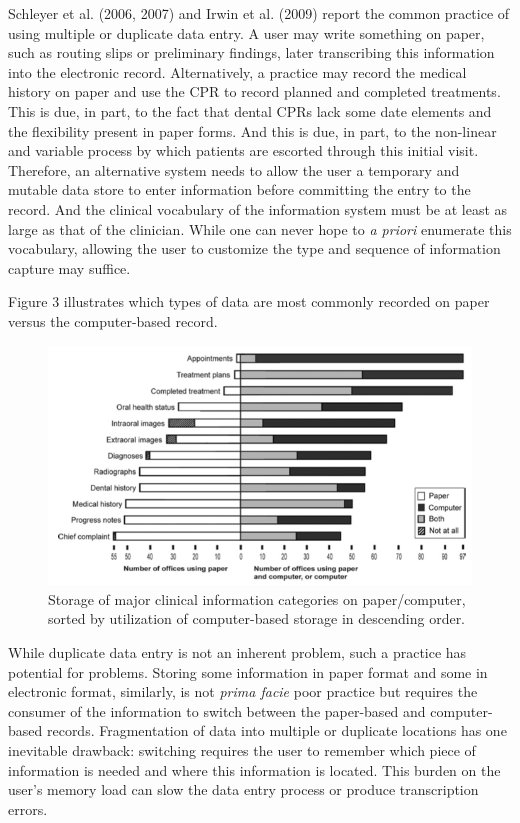 \documentclass[11pt]{article}
\begin{document}
Schleyer et al. (2006, 2007) and Irwin et al. (2009) report the common practice of using multiple or duplicate data entry. A user may write something on paper, such as routing slips or preliminary findings, later transcribing this information into the electronic record. Alternatively, a practice may record the medical history on paper and use the CPR to record planned and completed treatments. This is due, in part, to the fact that dental CPRs lack some date elements and the flexibility present in paper forms.\cite{Schleyer2007A-Qualitative-I} And this is due, in part, to the non-linear and variable process by which patients are escorted through this initial visit. Therefore, an alternative system needs to allow the user a temporary and mutable data store to enter information before committing the entry to the record. And the clinical vocabulary of the information system must be at least as large as that of the clinician. While one can never hope to \emph{a priori} enumerate this vocabulary, allowing the user to customize the type and sequence of information capture may suffice. 

Figure 3 illustrates which types of data are most commonly recorded on paper versus the computer-based record.\label{fig:3}
\begin{figure}[h!b]
\begin{center}
\includegraphics[width=\textwidth]{papervscomp.jpg}
\end{center}
\caption{Storage of major clinical information categories on paper/computer, sorted by utilization of computer-based storage in descending order.\cite{Schleyer2007A-Qualitative-I}}
\end{figure}
While duplicate data entry is not an inherent problem, such a practice has potential for problems. Storing some information in paper format and some in electronic format, similarly, is not \emph{prima facie} poor practice but requires the consumer of the information to switch between the paper-based and computer-based records. Fragmentation of data into multiple or duplicate locations has one inevitable drawback: switching requires the user to remember which piece of information is needed and where this information is located. This burden on the user's memory load can slow the data entry process or produce transcription errors.\cite{Salvucci2009Toward-a-unifie}
\end{document}

